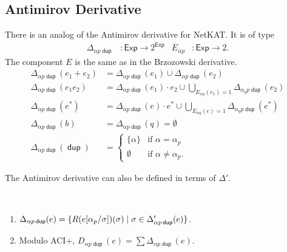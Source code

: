 \documentclass{article}
\newcommand\ssum{\mathop{\textstyle\sum}}
\newcommand\pdup{\mathop{\mathsf{dup}}}
\newcommand\Exp{\mathsf{Exp}}
\renewcommand\star{^{\textstyle *}}
\renewcommand\powerset[1]{2^{#1}}
\newcommand\clname{\mathrm{cl}}
\newcommand\cl[1]{\clname(#1)}
\begin{document}
\subsection*{Antimirov Derivative}

There is an analog of the Antimirov derivative for NetKAT. It is of type
\begin{align*}
\Delta_{\alpha p\pdup} &: \Exp\to\powerset\Exp & E_{\alpha p} &: \Exp\to 2.
\end{align*}
The component $E$ is the same as in the Brzozowski derivative.
\begin{align*}
\Delta_{\alpha p\pdup}(e_1+e_2) &= \Delta_{\alpha p\pdup}(e_1) \cup \Delta_{\alpha p\pdup}(e_2)\\
\Delta_{\alpha p\pdup}(e_1e_2) &= \Delta_{\alpha p\pdup}(e_1)\cdot e_2 \cup \bigcup_{E_{\alpha q}(e_1)=1}\Delta_{\alpha_q p\pdup}(e_2)\\
\Delta_{\alpha p\pdup}(e\star) &= \Delta_{\alpha p\pdup}(e)\cdot e\star \cup \bigcup_{E_{\alpha q}(e)=1}\Delta_{\alpha_q p\pdup}(e\star)\\
\Delta_{\alpha p\pdup}(b) &= \Delta_{\alpha p\pdup}(q) = \emptyset\\
\Delta_{\alpha p\pdup}(\pdup) &= \begin{cases}
\{\alpha\} & \text{if $\alpha=\alpha_p$}\\
\emptyset & \text{if $\alpha\neq\alpha_p$.}
\end{cases}
\end{align*}

The Antimirov derivative can also be defined in terms of $\Delta'$.


\begin{lemma}
\label{eq:DDelta}\ 
\begin{enumerate}[{\upshape (i)}]
\item
$\Delta_{\alpha p\pdup}(e) = \set{\rep\sigma{e\subst{\alpha_p}\sigma}}{\sigma\in\Delta'_{\alpha p\pdup}(e)}$.
\item
Modulo ACI+, $D_{\alpha p\pdup}(e) = \ssum\Delta_{\alpha p\pdup}(e)$.
\end{enumerate}
\end{lemma}
\end{document}
